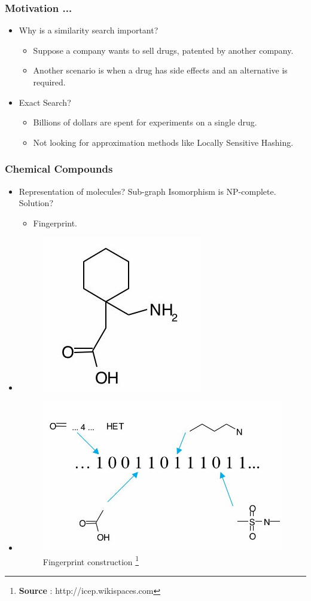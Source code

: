 \documentclass{beamer}
\begin{document}
\begin{frame}
\frametitle{Motivation ...}

\begin{itemize}

	\item<1-> Why is a similarity search important?
	\begin{itemize}
		\item<2-> Suppose a company wants to sell drugs, patented by another company.
		\item<3-> Another scenario is when a drug has side effects and an alternative is required.			
	\end{itemize}
	\item<4->  Exact Search?
	\begin{itemize}
	\item<5-> Billions of dollars are spent for experiments on a single drug.
	\item<6-> Not looking for approximation methods like Locally Sensitive Hashing.
	\end{itemize}
	\end{itemize}

\end{frame}



\begin{frame}
\frametitle{Chemical Compounds}

\begin{itemize}
	\item<1-> Representation of molecules? Sub-graph Isomorphism is NP-complete. Solution? 
\begin{itemize}
	\item<2->[] Fingerprint. 	
\end{itemize}

	\item<3->[]
	\begin{figure}[ht]	
	\centering
	\includegraphics[width=0.15\columnwidth]	{img/fng1.jpg}
\end{figure}

	\item<4->[]
	\begin{figure}[ht]	
	\centering
	\includegraphics[width=0.4\columnwidth]	{img/fng2.jpg}
\caption{Fingerprint construction \footnote{\textbf{Source} : http://icep.wikispaces.com}}
\end{figure}	
\end{itemize}

\end{frame}
\end{document}
